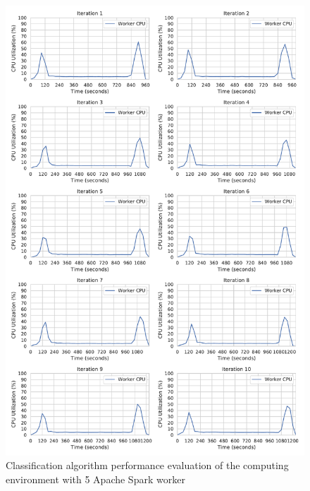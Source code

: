 \begin{figure}[h]
\centering
\includegraphics[scale=0.4]{images/07_evaluation/mortgage/mortgage_5_worker_cpu_performance}
\caption{Classification algorithm performance evaluation of the computing environment with 5 Apache Spark worker}
\label{fig:07_mortgage_static-cpu_results}
\end{figure}

